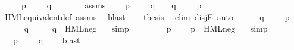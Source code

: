 \begin{isabellebody}
\ \ \ {\isacartoucheopen}{\isasymexists}\ {\isasymphi}{\isachardot}{\kern0pt}\ p\ {\isasymTurnstile}\ {\isasymphi}\ {\isasymand}\ {\isasymnot}\ q\ {\isasymTurnstile}\ {\isasymphi}{\isacartoucheclose}\isanewline
%
\isadelimproof
%
\endisadelimproof
%
\isatagproof
{}\isamarkupfalse%
\ {\isacharminus}{\kern0pt}\isanewline
\ \ \isamarkupfalse%
\ assms\ \isamarkupfalse%
\ {\isasymphi}\ \ {\isacartoucheopen}p\ {\isasymTurnstile}\ {\isasymphi}\ {\isasymand}\ {\isasymnot}\ q\ {\isasymTurnstile}\ {\isasymphi}\ {\isasymor}\ q\ {\isasymTurnstile}\ {\isasymphi}\ {\isasymand}\ {\isasymnot}\ p\ {\isasymTurnstile}\ {\isasymphi}{\isacartoucheclose}\isanewline
\ \ \ \ \isamarkupfalse%
\ HML{\isacharunderscore}{\kern0pt}equivalent{\isacharunderscore}{\kern0pt}def\ assms\ \isamarkupfalse%
\ blast\isanewline
\ \ \isamarkupfalse%
\ {\isacharquery}{\kern0pt}thesis\ \isamarkupfalse%
\ {\isacharparenleft}{\kern0pt}elim\ disjE{\isacharcomma}{\kern0pt}\ auto{\isacharparenright}{\kern0pt}\isanewline
\ \ \ \ \isamarkupfalse%
\ {\isacartoucheopen}q\ {\isasymTurnstile}\ {\isasymphi}{\isacartoucheclose}\ \ {\isacartoucheopen}{\isasymnot}\ p\ {\isasymTurnstile}\ {\isasymphi}{\isacartoucheclose}\isanewline
\ \ \ \ \isamarkupfalse%
\ {\isacartoucheopen}q\ {\isasymTurnstile}\ {\isasymphi}{\isacartoucheclose}\ \isamarkupfalse%
\ {\isacartoucheopen}{\isasymnot}\ q\ {\isasymTurnstile}\ HML{\isacharunderscore}{\kern0pt}neg\ {\isasymphi}{\isacartoucheclose}\ \isamarkupfalse%
\ simp\isanewline
\ \ \ \ \isamarkupfalse%
\ \isamarkupfalse%
\ {\isacartoucheopen}{\isasymnot}\ p\ {\isasymTurnstile}\ {\isasymphi}{\isacartoucheclose}\ \isamarkupfalse%
\ {\isacartoucheopen}p\ {\isasymTurnstile}\ HML{\isacharunderscore}{\kern0pt}neg\ {\isasymphi}{\isacartoucheclose}\ \isamarkupfalse%
\ simp\isanewline
\ \ \ \ \isamarkupfalse%
\ \isamarkupfalse%
\ {\isacartoucheopen}{\isasymexists}\ {\isasymphi}{\isachardot}{\kern0pt}\ p\ {\isasymTurnstile}\ {\isasymphi}\ {\isasymand}\ {\isasymnot}\ q\ {\isasymTurnstile}\ {\isasymphi}{\isacartoucheclose}\ \isamarkupfalse%
\ blast\isanewline
\ \ \isamarkupfalse%
\isanewline
{}\isamarkupfalse%
%
\endisatagproof
{\isafoldproof}%
%
\isadelimproof
%
\endisadelimproof
%
\begin{isamarkuptext}%

\end{isamarkuptext}
\end{isabellebody}
